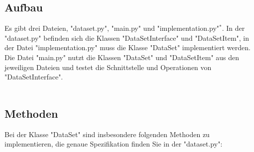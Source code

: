 \documentclass[]{article}
\begin{document}
\subsection{Aufbau}
Es gibt drei Dateien, "dataset.py", "main.py" und "implementation.py"$^*$.
In der "dataset.py" befinden sich die Klassen "DataSetInterface" und "DataSetItem",
in der Datei "implementation.py" muss die Klasse "DataSet" implementiert werden.
Die Datei "main.py" nutzt die Klassen "DataSet" und "DataSetItem" aus den jeweiligen Dateien und testet die Schnittstelle und Operationen von "DataSetInterface".\\
\\
\subsection{Methoden}
Bei der Klasse "DataSet" sind insbesondere folgenden Methoden zu implementieren, die genaue Spezifikation finden Sie in der "dataset.py":\\
\end{document}
